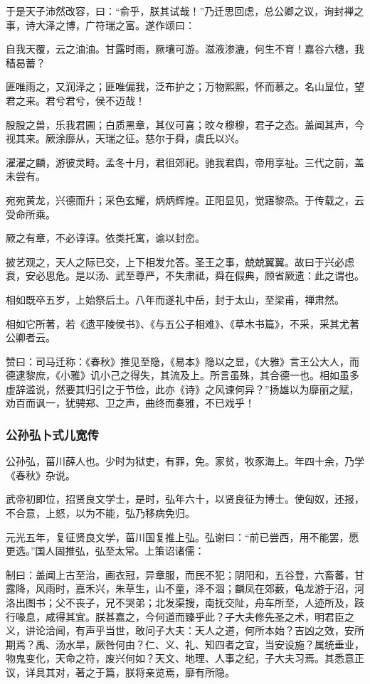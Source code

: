 \documentclass[]{article}
\begin{document}
于是天子沛然改容，曰：``俞乎，朕其试哉！''乃迁思回虑，总公卿之议，询封禅之事，诗大泽之博，广符瑞之富。遂作颂曰：

自我天覆，云之油油。甘露时雨，厥壤可游。滋液渗漉，何生不育！嘉谷六穗，我穑曷蓄？

匪唯雨之，又润泽之；匪唯偏我，泛布护之；万物熙熙，怀而慕之。名山显位，望君之来。君兮君兮，侯不迈哉！

股股之兽，乐我君圃；白质黑章，其仪可喜；旼々穆穆，君子之态。盖闻其声，今视其来。厥涂靡从，天瑞之征。慈尔于舜，虞氏以兴。

濯濯之麟，游彼灵畤。孟冬十月，君徂郊祀。驰我君舆，帝用享祉。三代之前，盖未尝有。

宛宛黄龙，兴德而升；采色玄耀，炳炳辉煌。正阳显见，觉寤黎烝。于传载之，云受命所乘。

厥之有章，不必谆谆。依类托寓，谕以封峦。

披艺观之，天人之际已交，上下相发允答。圣王之事，兢兢翼翼。故曰于兴必虑衰，安必思危。是以汤、武至尊严，不失肃祗，舜在假典，顾省厥遗：此之谓也。

相如既卒五岁，上始祭后土。八年而遂礼中岳，封于太山，至梁甫，禅肃然。

相如它所著，若《遗平陵侯书》、《与五公子相难》、《草木书篇》，不采，采其尤著公卿者云。

赞曰：司马迁称：《春秋》推见至隐，《易本》隐以之显，《大雅》言王公大人，而德逮黎庶，《小雅》讥小己之得失，其流及上。所言虽殊，其合德一也。相如虽多虚辞滥说，然要其归引之于节俭，此亦《诗》之风谏何异？''扬雄以为靡丽之赋，劝百而讽一，犹骋郑、卫之声，曲终而奏雅，不已戏乎！

\hypertarget{header-n4614}{%
\subsubsection{公孙弘卜式儿宽传}\label{header-n4614}}

公孙弘，菑川薛人也。少时为狱吏，有罪，免。家贫，牧豕海上。年四十余，乃学《春秋》杂说。

武帝初即位，招贤良文学士，是时，弘年六十，以贤良征为博士。使匈奴，还报，不合意，上怒，以为不能，弘乃移病免归。

元光五年，复征贤良文学，菑川国复推上弘。弘谢曰：``前已尝西，用不能罢，愿更选。''国人固推弘，弘至太常。上策诏诸儒：

制曰：盖闻上古至治，画衣冠，异章服，而民不犯；阴阳和，五谷登，六畜蕃，甘露降，风雨时，嘉禾兴，朱草生，山不童，泽不涸；麟凤在郊薮，龟龙游于沼，河洛出图书；父不丧子，兄不哭弟；北发渠搜，南抚交阯，舟车所至，人迹所及，跂行喙息，咸得其宜。朕甚嘉之，今何道而臻乎此？子大夫修先圣之术，明君臣之义，讲论洽闻，有声乎当世，敢问子大夫：天人之道，何所本始？吉凶之效，安所期焉？禹、汤水旱，厥咎何由？仁、义、礼、知四者之宜，当安设施？属统垂业，物鬼变化，天命之符，废兴何如？天文、地理、人事之纪，子大夫习焉。其悉意正议，详具其对，著之于篇，朕将亲览焉，靡有所隐。
\end{document}
